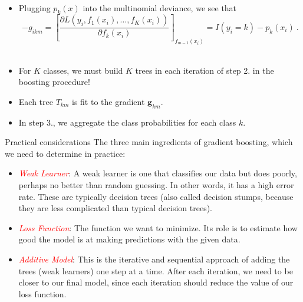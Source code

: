 \documentclass[
  10pt,
  ignorenonframetext,
]{beamer}
\providecommand{\tightlist}{%
  \setlength{\itemsep}{0pt}\setlength{\parskip}{0pt}}
\begin{document}
\begin{frame}
\(~\)

\begin{itemize}
\item
  Plugging \(p_k(x)\) into the multinomial deviance, we see that\\
  \[-g_{ikm} = \left[ \frac{\partial L(y_i, f_1(x_i),\ldots, f_K(x_i))}{\partial f_k(x_i)} \right]_{f_{m-1}(x_i)} = I(y_i =k) - p_k(x_i) \ .\]
  \(~\)
\item
  For \(K\) classes, we must build \(K\) trees in each iteration of step
  2. in the boosting procedure!
\end{itemize}

\vspace{2mm}

\begin{itemize}
\tightlist
\item
  Each tree \(T_{km}\) is fit to the gradient \(\mathbf{g}_{km}\).
\end{itemize}

\vspace{2mm}

\begin{itemize}
\tightlist
\item
  In step 3., we aggregate the class probabilities for each class \(k\).
\end{itemize}
\end{frame}

\begin{frame}{Practical considerations}
\protect\hypertarget{practical-considerations}{}
The three main ingredients of gradient boosting, which we need to
determine in practice:

\vspace{2mm}

\begin{itemize}
\item
  \emph{\textcolor{red}{Weak Learner}}: A weak learner is one that
  classifies our data but does poorly, perhaps no better than random
  guessing. In other words, it has a high error rate. These are
  typically decision trees (also called decision stumps, because they
  are less complicated than typical decision trees).
\item
  \emph{\textcolor{red}{Loss Function}}: The function we want to
  minimize. Its role is to estimate how good the model is at making
  predictions with the given data.
\item
  \emph{\textcolor{red}{Additive Model}}: This is the iterative and
  sequential approach of adding the trees (weak learners) one step at a
  time. After each iteration, we need to be closer to our final model,
  since each iteration should reduce the value of our loss function.
\end{itemize}
\end{frame}
\end{document}
